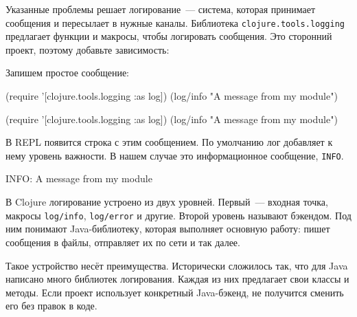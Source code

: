 Указанные проблемы решает логирование~--- система, которая принимает сообщения и
пересылает в нужные каналы. Библиотека \texttt{clojure.\-tools.\-logging} предлагает
функции и макросы, чтобы логировать сообщения. Это сторонний проект, поэтому
добавьте зависимость:


\begin{english}
  \begin{clojure}
  \end{clojure}
\end{english}

\noindent
Запишем простое сообщение:

\ifnarrow

\begin{english}
  \begin{clojure}
(require
  '[clojure.tools.logging :as log])
(log/info "A message from my module")
  \end{clojure}
\end{english}

\else

\begin{english}
  \begin{clojure}
(require '[clojure.tools.logging :as log])
(log/info "A message from my module")
  \end{clojure}
\end{english}

\fi

\noindent
В REPL появится строка с этим сообщением. По умолчанию лог добавляет к нему
уровень важности. В нашем случае это информационное сообщение, \verb|INFO|.

\begin{english}
  \begin{text}
INFO: A message from my module
  \end{text}
\end{english}

В Clojure логирование устроено из двух уровней. Первый~--- входная точка,
макросы \verb|log/info|, \verb|log/error| и другие. Второй уровень называют
бэкендом. Под ним понимают Java-библиотеку, которая выполняет основную работу:
пишет сообщения в файлы, отправляет их по сети и так далее.

Такое устройство несёт преимущества. Исторически сложилось так, что для Java
написано много библиотек логирования. Каждая из них предлагает свои классы и
методы. Если проект использует конкретный Java-бэкенд, не получится сменить его
без правок в коде.

